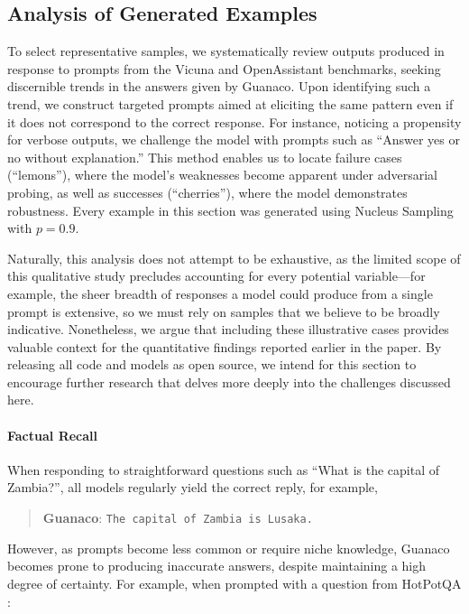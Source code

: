 \subsection{Analysis of Generated Examples}
\label{ssec:examples}

To select representative samples, we systematically review outputs produced in response to prompts from the Vicuna and OpenAssistant benchmarks, seeking discernible trends in the answers given by {Guanaco}. Upon identifying such a trend, we construct targeted prompts aimed at eliciting the same pattern even if it does not correspond to the correct response. For instance, noticing a propensity for verbose outputs, we challenge the model with prompts such as ``Answer yes or no without explanation.'' This method enables us to locate failure cases (``lemons''), where the model's weaknesses become apparent under adversarial probing, as well as successes (``cherries''), where the model demonstrates robustness. Every example in this section was generated using Nucleus Sampling \cite{holtzmancurious} with $p=0.9$.

Naturally, this analysis does not attempt to be exhaustive, as the limited scope of this qualitative study precludes accounting for every potential variable—for example, the sheer breadth of responses a model could produce from a single prompt is extensive, so we must rely on samples that we believe to be broadly indicative. Nonetheless, we argue that including these illustrative cases provides valuable context for the quantitative findings reported earlier in the paper. By releasing all code and models as open source, we intend for this section to encourage further research that delves more deeply into the challenges discussed here.
\paragraph{Factual Recall} When responding to straightforward questions such as ``What is the capital of Zambia?'', all models regularly yield the correct reply, for example,

\begin{quote} 
    \textbf{Guanaco}:
    \texttt{The capital of Zambia is Lusaka.}
\end{quote}

 However, as prompts become less common or require niche knowledge, {Guanaco} becomes prone to producing inaccurate answers, despite maintaining a high degree of certainty. For example, when prompted with a question from HotPotQA \citep{yang2018hotpotqa}:

